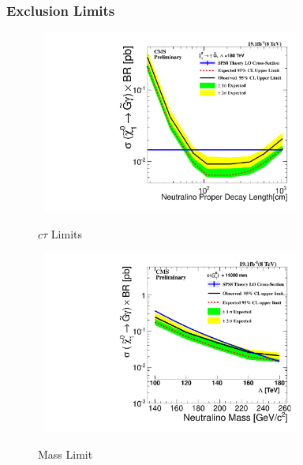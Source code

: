\documentclass{beamer}
\begin{document}
\begin{frame}
\frametitle{Exclusion Limits}
\begin{figure}[ht]
\begin{minipage}[b]{0.45\linewidth}
\centering
\mbox{
\includegraphics[height=6cm,width=\textwidth]{THESISPLOTS/Neutralino_CrossSecTimesBR_Uplimit.pdf}}
\vspace{-1cm}
\caption{$c\tau$ Limits }
\label{fig:ctaulimit}
\end{minipage}
\hspace{0.1cm}
\begin{minipage}[b]{0.45\linewidth}
\centering
\mbox{
\includegraphics[height=6cm, width=\textwidth]{THESISPLOTS/Neutralino_CrosSecVsMass_Exclusion_limit_11000.pdf}}
\vspace{-1cm}
\caption{Mass Limit }
\label{fig:masslimit}
\end{minipage}
\end{figure}
\end{frame}
\end{document}
